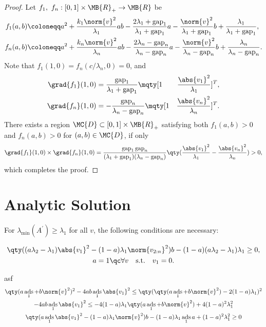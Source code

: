 \documentclass[nobib]{my-handout}
\theoremstyle{definition}
\theoremstyle{remark}
\DeclareMathOperator{\ads}{ads}
\DeclareMathOperator{\gap}{gap}
\begin{document}
\begin{proof}
	Let $f_1,\ f_n : [0, 1] \times \MB{R}_{+} \to \MB{R}$ be
	\begin{align*}
		f_1(a,b) &\coloneqq a^2 + \frac{k_1 \norm{v}^2}{\lambda_1} a b - \frac{2
		\lambda_1  + \gap_1}{\lambda_1 + \gap_1} a - \frac{\norm{v}^2}{\lambda_1 +
		\gap_1} b + \frac{\lambda_1}{\lambda_1 + \gap_1}, \\
		f_n(a,b) &\coloneqq a^2 + \frac{k_n \norm{v}^2}{\lambda_n} a b - \frac{2
		\lambda_n - \gap_n}{\lambda_n - \gap_n} a - \frac{\norm{v}^2}{\lambda_n -
		\gap_n} b + \frac{\lambda_n}{\lambda_n - \gap_n}.
	\end{align*}
	Note that $f_1(1, 0) = f_n(c/\lambda_n, 0) = 0$, and
	\begin{align*}
		\grad{f_1}(1, 0) &= \frac{\gap_1}{\lambda_1 + \gap_1} \mqty[1 &
		\frac{\abs{v_1}^2}{\lambda_1}]^T, \\
		\grad{f_n}(1, 0) &= - \frac{\gap_n}{\lambda_n - \gap_n} \mqty[1 &
		\frac{\abs{v_n}^2}{\lambda_n}]^T.
	\end{align*}
	There exists a region $\MC{D} \subset [0,1] \times \MB{R}_{+}$ satisfying
	both $f_1(a, b) > 0$ and $f_n(a, b) > 0$ for $(a,b) \in \MC{D}$, if only 
	\begin{equation*}
		\grad{f_1}(1, 0) \times \grad{f_n}(1, 0)
		= \frac{\gap_1 \gap_n}{(\lambda_1 + \gap_1)(\lambda_n - \gap_n)}
		\qty(\frac{\abs{v_1}^2}{\lambda_1} - \frac{\abs{v_n}^2}{\lambda_n}) > 0,
	\end{equation*}
	which completes the proof.
\end{proof}


\section{Analytic Solution}





 

For $\lambda_{\min}(A^\prime) \ge \lambda_1$ for all $v$, the following
conditions are necessary:
\begin{fullwidth}
	\begin{gather}
		\qty((a \lambda_2 - \lambda_1) \abs{v_1}^2 - (1-a) \lambda_1
		\norm{v_{2:n}}^2) b - (1-a) (a \lambda_2 - \lambda_1) \lambda_1 \ge 0, \\
		a = 1 \qc \forall v \quad \text{s.t.} \quad v_1 = 0.
	\end{gather}
\end{fullwidth}
asf
\begin{gather*}
	\qty(a \ads_1 + b \norm{v}^2)^2 - 4 ab \ads_1 \abs{v_1}^2
	\le \qty(\qty(a \ads_1 + b \norm{v}^2) - 2 (1-a) \lambda_1)^2 \\
	- 4 ab \ads_1 \abs{v_1}^2
	\le - 4 (1-a) \lambda_1 \qty(a \ads_1 + b \norm{v}^2) + 4 (1-a)^2
	\lambda_1^2 \\
	\qty(a \ads_1 \abs{v_1}^2 - (1-a) \lambda_1 \norm{v}^2) b
	- (1-a) \lambda_1 \ads_1 a + (1-a)^2 \lambda_1^2 \ge 0
\end{gather*}




\end{document}
